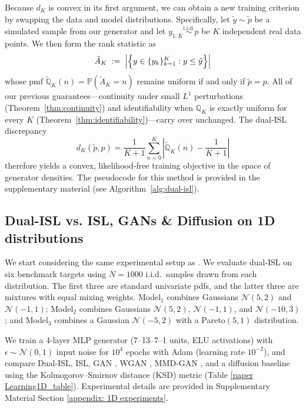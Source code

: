\documentclass{article}
\newcommand{\abs}[1]{\left\lvert#1\right\rvert}
\newcommand{\normdist}[2]{\mathcal{N}(#1, #2)}
\begin{document}
Because \(d_K\) is convex in its first argument, we can obtain a new training criterion by swapping the data and model distributions.  Specifically, let \(\tilde y\sim \tilde p\) be a simulated sample from our generator and let \(y_{1:K}\overset{\mathrm{i.i.d.}}{\sim} p\) be \(K\) independent real data points.  We then form the rank statistic as
\begin{align*}
\tilde{A}_K \;:=\; 
\abs{\Bigl\{y \in \{y_{k}\}_{k=1}^{K} : y \leq \tilde{y}\Bigr\}}
\end{align*}
whose pmf \(\tilde{\mathbb{Q}}_K(n)=\mathbb{P}\left(\tilde{A}_K=n\right)\) remains uniform if and only if \(\tilde p=p\).  All of our previous guarantees—continuity under small \(L^1\) perturbations (Theorem~\ref{thm:continuity}) and identifiability when \(\mathbb{Q}_K\) is exactly uniform for every \(K\) (Theorem~\ref{thm:identifiability})—carry over unchanged. The dual‐ISL discrepancy
\[
d_K(\tilde p,p)
=\frac1{K+1}\sum_{n=0}^K\left|\tilde{\mathbb{Q}}_K(n)-\dfrac{1}{K+1}\right|
\]
therefore yields a convex, likelihood‐free training objective in the space of generator densities. The pseudocode for this method is provided in the supplementary material (see Algorithm~\ref{alg:dual-isl}).

\subsection{Dual-ISL vs. ISL, GANs \& Diffusion on 1D distributions}

We start considering the same experimental setup as \cite{zaheer2017gan, de2024training}. We evaluate dual‐ISL on six benchmark targets using \(N=1000\) i.i.d.\ samples drawn from each distribution.  The first three are standard univariate pdfs, and the latter three are mixtures with equal mixing weights. Model$_1$ combines Gaussians $\normdist{5}{2}$ and $\normdist{-1}{1}$; Model$_2$ combines Gaussians $\normdist{5}{2}$, $\normdist{-1}{1}$, and $\normdist{-10}{3}$; and Model$_3$ combines a Gaussian $\normdist{-5}{2}$ with a Pareto$(5,1)$ distribution.

We train a 4-layer MLP generator (7–13–7–1 units, ELU activations) with $\epsilon\sim\mathcal{N}(0,1)$ input noise for $10^4$ epochs with Adam (learning rate $10^{-2}$), and compare Dual-ISL, ISL, GAN \cite{goodfellow2014generative}, WGAN \cite{arjovsky2017wasserstein}, MMD-GAN \cite{li2017mmd}, and a diffusion baseline using the Kolmogorov–Smirnov distance (KSD) metric (Table \ref{paper Learning1D_table}). Experimental details are provided in Supplementary Material Section \ref{appendix: 1D experiments}.
\end{document}
